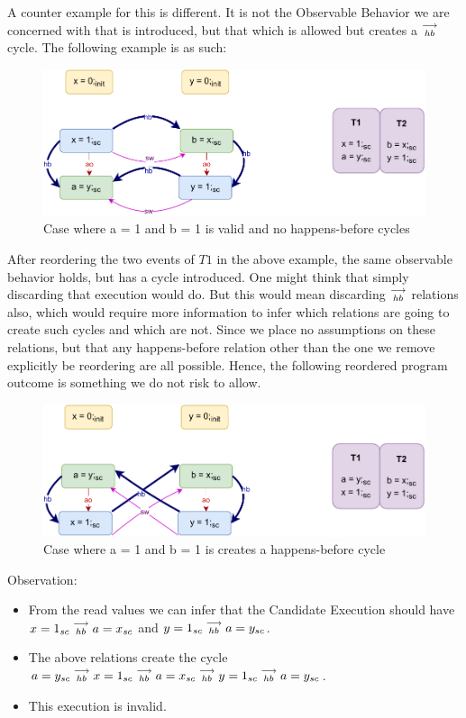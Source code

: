         A counter example for this is different. It is not the Observable Behavior we are concerned with that is introduced, but that which is allowed but creates a $\stackrel{\longrightarrow}{_{hb}}$ cycle. The following example is as such:
        \begin{figure}[H]
            \centering
            \includegraphics[scale=0.7]{InstructionReordering/Example5(Wsc-Rsc).pdf}
            \caption{Case where a = 1 and b = 1 is valid and no happens-before cycles}
        \end{figure}

        After reordering the two events of $T1$ in the above example, the same observable behavior holds, but has a cycle introduced. One might think that simply discarding that execution would do. But this would mean discarding $\stackrel{\longrightarrow}{_{hb}}$ relations also, which would require more information to infer which relations are going to create such cycles and which are not. Since we place no assumptions on these relations, but that any happens-before relation other than the one we remove explicitly be reordering are all possible. Hence, the following reordered program outcome is something we do not risk to allow.

        \begin{figure}[H]
            \centering
            \includegraphics[scale=0.7]{InstructionReordering/Example5R(Wsc-Rsc).pdf}
            \caption{Case where a = 1 and b = 1 is creates a happens-before cycle}
        \end{figure}

        Observation:
        \begin{itemize}
            \item From the read values we can infer that the Candidate Execution should have $x=1_{sc}\stackrel{\longrightarrow}{_{hb}}a=x_{sc}$ and $y=1_{sc}\stackrel{\longrightarrow}{_{hb}}a=y_{sc}$.
            \item The above relations create the cycle $a=y_{sc}\stackrel{\longrightarrow}{_{hb}}x=1_{sc}\stackrel{\longrightarrow}{_{hb}}a=x_{sc}\stackrel{\longrightarrow}{_{hb}}y=1_{sc}\stackrel{\longrightarrow}{_{hb}}a=y_{sc}$.
            \item This execution is invalid. 
        \end{itemize}

